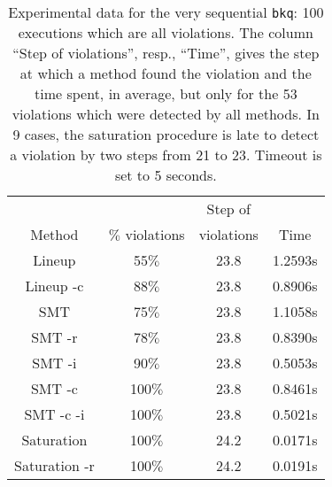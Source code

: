 \begin{table}[t]
  \footnotesize
  \centering
  \setlength{\tabcolsep}{1.8mm}
  \begin{tabular}{cccc}
   	        & 	                     & Step of     \\
   Method & $\%$ violations  & violations & Time \\
  \hline
  Lineup & 55$\%$ & 23.8 & 1.2593s \\
  Lineup -c & 88$\%$ & 23.8 & 0.8906s \\
  SMT & 75$\%$ & 23.8 & 1.1058s \\
  SMT -r & 78$\%$ & 23.8 & 0.8390s\\
  SMT -i & 90$\%$ & 23.8 & 0.5053s\\
  SMT -c & 100$\%$ & 23.8 & 0.8461s \\
  SMT -c -i & 100$\%$ & 23.8 & 0.5021s \\
  Saturation & 100$\%$ & 24.2 & 0.0171s\\
  Saturation -r  & 100$\%$ & 24.2 & 0.0191s
  \end{tabular} 
  \caption{Experimental data for the very sequential {\tt bkq}: 100 executions which are all violations. The column ``Step of violations'', resp., ``Time'',
  gives the step at which a method found the violation and the time spent, in average, but only for the 53 violations
  which were detected by all methods. In 9 cases, the saturation procedure is late to detect a violation by two steps
  from 21 to 23. Timeout is set to 5 seconds.
    }
  \label{tab:exp:static}
\end{table}
